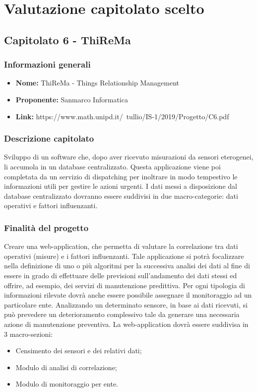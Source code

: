

\section{Valutazione capitolato scelto}

	\subsection{Capitolato 6 - ThiReMa}
	
	\subsubsection{Informazioni generali}
	\begin{itemize}
		\item \textbf{Nome:} ThiReMa - Things Relationship Management
		\item \textbf{Proponente:} Sanmarco Informatica
		\item \textbf{Link:} https://www.math.unipd.it/~tullio/IS-1/2019/Progetto/C6.pdf
	\end{itemize}
	
	\subsubsection{Descrizione capitolato}
	Sviluppo di un software che,  dopo aver ricevuto misurazioni da sensori eterogenei, li accumola in un database centralizzato. Questa applicazione viene poi completata da un servizio di dispatching per inoltrare in modo tempestivo le informazioni utili per gestire le azioni urgenti.
	I dati messi a disposizione dal database centralizzato dovranno essere suddivisi in due macro-categorie: dati operativi e fattori influenzanti.
	
	\subsubsection{Finalità del progetto}
	Creare una web-application, che permetta di valutare la correlazione tra dati operativi (misure) e i fattori influenzanti. Tale applicazione si potrà focalizzare nella definizione di uno o più algoritmi per la successiva analisi dei dati al fine di essere in grado di effettuare delle previsioni sull’andamento dei dati stessi ed offrire, ad esempio, dei servizi di manutenzione predittiva.
	Per ogni tipologia di informazioni rilevate dovrà anche essere possibile assegnare il monitoraggio ad un particolare ente. 
	Analizzando un determinato sensore, in base ai dati ricevuti, si può prevedere un deterioramento complessivo tale da generare una necessaria azione di manutenzione preventiva.
	La web-application dovrà essere suddivisa in 3 macro-sezioni:
	\begin{itemize}
		\item Censimento dei sensori e dei relativi dati;
		\item Modulo di analisi di correlazione;
		\item Modulo di monitoraggio per ente.
	\end{itemize}
	
